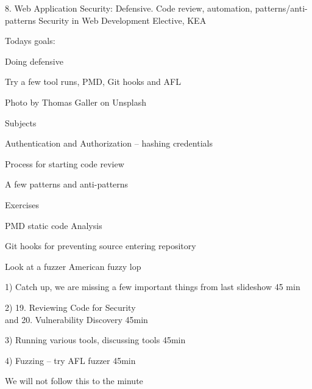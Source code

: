 \documentclass[Screen16to9,17pt]{foils}
\begin{document}
\mytitlepage
{8. Web Application Security: Defensive. Code review, automation, patterns/anti-patterns}
{Security in Web Development Elective, KEA}




Todays goals:
\begin{list2}
\item Doing defensive
\item Try a few tool runs, PMD, Git hooks and AFL
\end{list2}

Photo by Thomas Galler on Unsplash




\begin{list1}
\item Subjects
\begin{list2}
\item Authentication and Authorization -- hashing credentials
\item Process for starting code review
\item A few patterns and anti-patterns

\end{list2}
\item Exercises
\begin{list2}
\item PMD static code Analysis
\item Git hooks for preventing source entering repository
\item Look at a fuzzer American fuzzy lop
\end{list2}
\end{list1}


\begin{list2}
\item 1) Catch up, we are missing a few important things from last slideshow 45 min
\item 2) 19. Reviewing Code for Security \\
and 20. Vulnerability Discovery 45min
\item 3) Running various tools, discussing tools 45min
\item 4) Fuzzing -- try AFL fuzzer 45min
\end{list2}

We will not follow this to the minute
\end{document}
